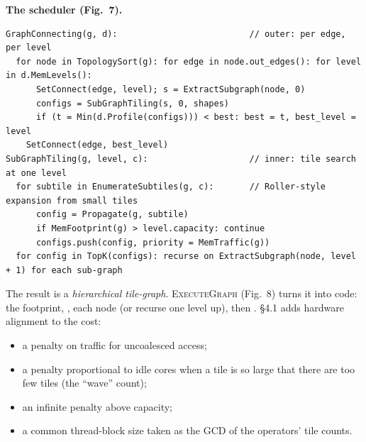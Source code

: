 \textbf{The scheduler (Fig.~7).}
\begin{lstlisting}
GraphConnecting(g, d):                          // outer: per edge, per level
  for node in TopologySort(g): for edge in node.out_edges(): for level in d.MemLevels():
      SetConnect(edge, level); s = ExtractSubgraph(node, 0)
      configs = SubGraphTiling(s, 0, shapes)
      if (t = Min(d.Profile(configs))) < best: best = t, best_level = level
    SetConnect(edge, best_level)
SubGraphTiling(g, level, c):                    // inner: tile search at one level
  for subtile in EnumerateSubtiles(g, c):       // Roller-style expansion from small tiles
      config = Propagate(g, subtile)
      if MemFootprint(g) > level.capacity: continue
      configs.push(config, priority = MemTraffic(g))
  for config in TopK(configs): recurse on ExtractSubgraph(node, level + 1) for each sub-graph
\end{lstlisting}

The result is a \emph{hierarchical tile-graph}. \textsc{ExecuteGraph} (Fig.~8) turns
it into code:  the footprint, ,  each
node (or recurse one level up), then . \S4.1 adds hardware alignment
to the cost:
\begin{itemize}
\item a penalty on traffic for uncoalesced access;
\item a penalty proportional to idle cores when a tile is so large that there are too
  few tiles (the ``wave'' count);
\item an infinite penalty above capacity;
\item a common thread-block size taken as the GCD of the operators' tile counts.
\end{itemize}

